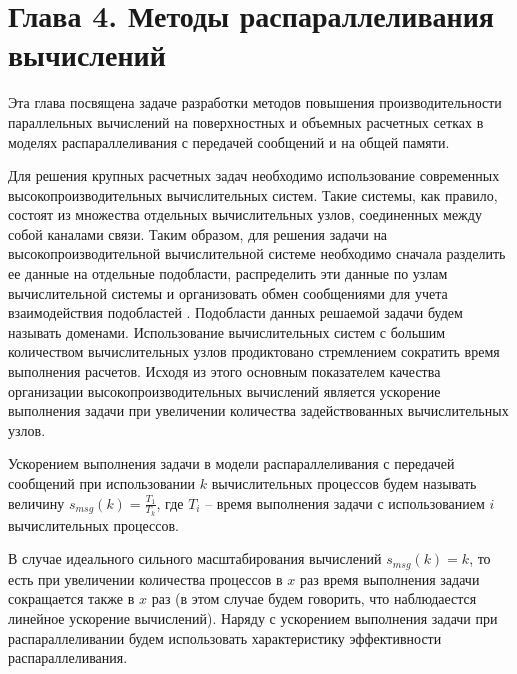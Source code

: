 \newpage
\section*{Глава 4. Методы распараллеливания вычислений} %
\addtocounter{section}{1}                                                    %
\setcounter{subsection}{0}
\setcounter{figure}{0}
\setcounter{equation}{0}
\setcounter{table}{0}
\setcounter{theorem}{0}
\setcounter{lemma}{0}
\setcounter{definition}{0}

Эта глава посвящена задаче разработки методов повышения производительности параллельных вычислений на поверхностных и объемных расчетных сетках в моделях распараллеливания с передачей сообщений и на общей памяти.

Для решения крупных расчетных задач необходимо использование современных высокопроизводительных вычислительных систем.
Такие системы, как правило, состоят из множества отдельных вычислительных узлов, соединенных между собой каналами связи.
Таким образом, для решения задачи на высокопроизводительной вычислительной системе необходимо сначала разделить ее данные на отдельные подобласти, распределить эти данные по узлам вычислительной системы и организовать обмен сообщениями для учета взаимодействия подобластей \cite{GOST57700HPC}.
Подобласти данных решаемой задачи будем называть доменами.
Использование вычислительных систем с большим количеством вычислительных узлов продиктовано стремлением сократить время выполнения расчетов.
Исходя из этого основным показателем качества организации высокопроизводительных вычислений является ускорение выполнения задачи при увеличении количества задействованных вычислительных узлов.

\begin{definition}
Ускорением выполнения задачи в модели распараллеливания с передачей сообщений при использовании $k$ вычислительных процессов будем называть величину $s_{msg}(k) = \frac{T_1}{T_k}$, где $T_i$ -- время выполнения задачи с использованием $i$ вычислительных процессов. 
\end{definition}

В случае идеального сильного масштабирования вычислений $s_{msg}(k) = k$, то есть при увеличении количества процессов в $x$ раз время выполнения задачи сокращается также в $x$ раз (в этом случае будем говорить, что наблюдаестся линейное ускорение вычислений).
Наряду с ускорением выполнения задачи при распараллеливании будем использовать характеристику эффективности распараллеливания.

